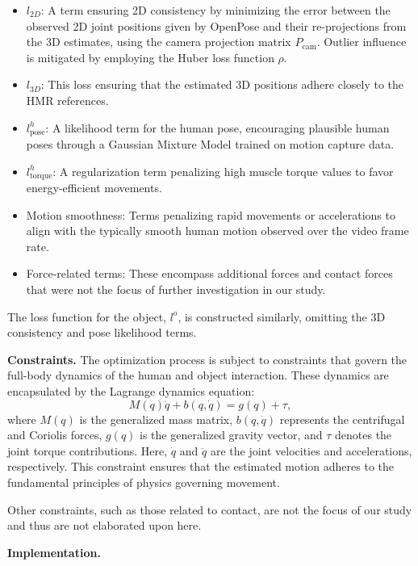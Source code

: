 \begin{itemize}
    \item 
        \(l_{2D}\): A term ensuring 2D consistency by minimizing the error between the observed 2D joint positions given by OpenPose and 
        their re-projections from the 3D estimates, using the camera projection matrix \(P_{\text{cam}}\). Outlier influence is mitigated 
        by employing the Huber loss function \(\rho\).
    \item 
        \(l_{3D}\): This loss ensuring that the estimated 3D positions adhere closely to the HMR references.
    \item 
        \(l_{\text{pose}}^h\): A likelihood term for the human pose, encouraging plausible human poses through a Gaussian Mixture Model 
        trained on motion capture data.
    \item
        \(l_{\text{torque}}^h\): A regularization term penalizing high muscle torque values to favor energy-efficient movements.
    \item 
        Motion smoothness: Terms penalizing rapid movements or accelerations to align with the typically smooth human motion observed over 
        the video frame rate.
    \item
        Force-related terms: These encompass additional forces and contact forces that were not the focus of further investigation in our 
        study.
\end{itemize}

The loss function for the object, \(l^o\), is constructed similarly, omitting the 3D consistency and pose likelihood terms.

\noindent\textbf{Constraints.} The optimization process is subject to constraints that govern the full-body dynamics of the human and object 
interaction. These dynamics are encapsulated by the Lagrange dynamics equation:
\[
M(q)\ddot{q} + b(q, \dot{q}) = g(q) + \tau,
\]
where \( M(q) \) is the generalized mass matrix, \( b(q, \dot{q}) \) represents the centrifugal and Coriolis forces, \( g(q) \) is the 
generalized gravity vector, and \( \tau \) denotes the joint torque contributions. Here, \( \dot{q} \) and \( \ddot{q} \) are the joint 
velocities and accelerations, respectively. This constraint ensures that the estimated motion adheres to the fundamental principles of physics 
governing movement.

Other constraints, such as those related to contact, are not the focus of our study and thus are not elaborated upon here.

\noindent\textbf{Implementation.}